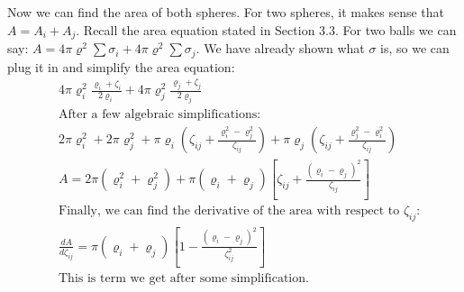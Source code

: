 \documentclass{article}
\begin{document}
Now we can find the area of both spheres. For two spheres, it makes sense that $A = A_i + A_j$. Recall the area equation stated in Section 3.3. For two balls we can say: $A = 4\pi\varrho^2\sum{\sigma_i} + 4\pi\varrho^2\sum{\sigma_j}$. We have already shown what $\sigma$ is, so we can plug it in and simplify the area equation:
\begin{align*}
&4\pi\varrho_i^2\frac{\varrho_i + \zeta_i}{2\varrho_i} + 4\pi\varrho_j^2\frac{\varrho_j + \zeta_j}{2\varrho_j} \\
&\text{After a few algebraic simplifications:} \\
&2\pi\varrho_i^2 +2\pi\varrho_j^2 +\pi\varrho_i\left(\zeta_{ij} + \frac{\varrho_i^2 - \varrho_j^2}{\zeta_{ij}}\right)+\pi\varrho_j\left(\zeta_{ij} + \frac{\varrho_j^2 - \varrho_i^2}{\zeta_{ij}}\right) \\
&A  = 2\pi(\varrho_i^2 + \varrho_j^2) + \pi(\varrho_i+\varrho_j)\left[\zeta_{ij}+\frac{(\varrho_i-\varrho_j)^2}{\zeta_{ij}}\right] \\
&\text{Finally, we can find the derivative of the area with respect to $\zeta_{ij}$:} \\
&\frac{dA}{d\zeta_{ij}} = \pi(\varrho_i+\varrho_j)\left[1-\frac{(\varrho_i - \varrho_j)^2}{\zeta_{ij}^2}\right] \\
&\text{This is term we get after some simplification.}
\end{align*}
\end{document}
